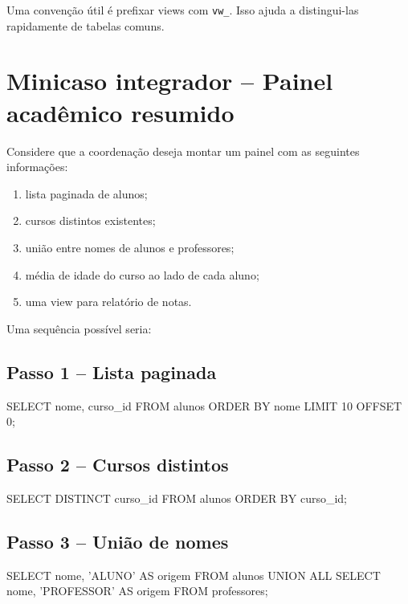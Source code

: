 \begin{quadro_dica}
Uma convenção útil é prefixar views com \texttt{vw\_}. Isso ajuda a distingui-las rapidamente de tabelas comuns.
\end{quadro_dica}

\section{Minicaso integrador -- Painel acadêmico resumido}

Considere que a coordenação deseja montar um painel com as seguintes informações:

\begin{enumerate}
    \item lista paginada de alunos;
    \item cursos distintos existentes;
    \item união entre nomes de alunos e professores;
    \item média de idade do curso ao lado de cada aluno;
    \item uma view para relatório de notas.
\end{enumerate}

Uma sequência possível seria:

\subsection*{Passo 1 -- Lista paginada}

\begin{sqlcode}
SELECT nome, curso_id
FROM alunos
ORDER BY nome
LIMIT 10 OFFSET 0;
\end{sqlcode}

\subsection*{Passo 2 -- Cursos distintos}

\begin{sqlcode}
SELECT DISTINCT curso_id
FROM alunos
ORDER BY curso_id;
\end{sqlcode}

\subsection*{Passo 3 -- União de nomes}

\begin{sqlcode}
SELECT nome, 'ALUNO' AS origem
FROM alunos
UNION ALL
SELECT nome, 'PROFESSOR' AS origem
FROM professores;
\end{sqlcode}

